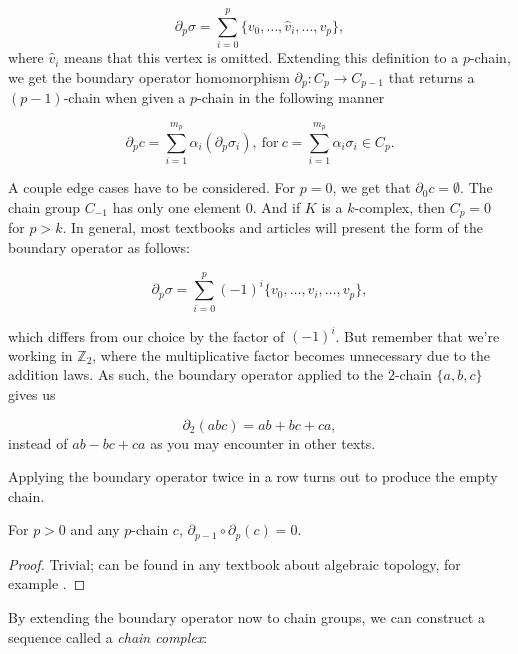 \begin{equation*}
  \partial_{p}\sigma = \sum_{i=0}^{p}\{v_{0}, \ldots, \hat{v}_{i}, \ldots, v_{p}\},
\end{equation*}
where $\hat{v}_{i}$ means that this vertex is omitted. Extending this definition to a $p$-chain, we get the boundary operator homomorphism $\partial_{p}: C_{p} \to C_{p-1}$ that returns a $(p-1)$-chain when given a $p$-chain in the following manner

\begin{equation*}
  \partial_{p}c = \sum_{i=1}^{m_{p}}\alpha_{i}(\partial_{p}\sigma_{i}), \: \text{for} \: c = \sum_{i=1}^{m_{p}}\alpha_{i}\sigma_{i} \in C_{p}.
\end{equation*}

A couple edge cases have to be considered. For $p = 0$, we get that $\partial_{0}c = \emptyset$. The chain group $C_{-1}$ has only one element $0$. And if $K$ is a $k$-complex, then $C_{p} = 0$ for $p>k$. In general, most textbooks and articles will present the form of the boundary operator as follows:

\begin{equation*}
  \partial_{p}\sigma = \sum_{i=0}^{p}(-1)^{i} \{v_{0}, \ldots, \hat{v}_{i}, \ldots, v_{p}\},
\end{equation*}

which differs from our choice by the factor of $(-1)^{i}$. But remember that we're working in $\mathbb{Z}_{2}$, where the multiplicative factor becomes unnecessary due to the addition laws. As such, the boundary operator applied to the $2$-chain $\{a,b,c\}$ gives us

\begin{equation*}
  \partial_{2}(abc) = ab + bc + ca,
\end{equation*}
instead of $ab - bc + ca$ as you may encounter in other texts.

Applying the boundary operator twice in a row turns out to produce the empty chain.

\begin{lemma}
  For $p>0$ and any $p$-chain $c$, $\partial_{p-1}\circ\partial_{p}(c) = 0$.
\end{lemma}

\begin{proof}
  Trivial; can be found in any textbook about algebraic topology, for example \cite{hatcher2002algebraic}.
\end{proof}

By extending the boundary operator now to chain groups, we can construct a sequence called a \textit{chain complex}:

